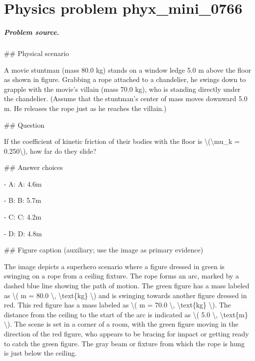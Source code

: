 
\chapter{Physics problem phyx\_mini\_0766}
\label{ch:PhyXMiniProblems_problem_phyx_mini_0766}

\paragraph{Problem source.}
\#\# Physical scenario

A movie stuntman (mass 80.0 kg) stands on a window ledge 5.0 m above the floor as shown in figure. Grabbing a rope attached to a chandelier, he swings down to grapple with the movie's villain (mass 70.0 kg), who is standing directly under the chandelier. (Assume that the stuntman's center of mass moves downward 5.0 m. He releases the rope just as he reaches the villain.)

\#\# Question

If the coefficient of kinetic friction of their bodies with the floor is \textbackslash{}(\textbackslash{}mu\_k = 0.250\textbackslash{}), how far do they slide?

\#\# Answer choices

- A: A: 4.6m

- B: B: 5.7m

- C: C: 4.2m

- D: D: 4.8m

\#\# Figure caption (auxiliary; use the image as primary evidence)

The image depicts a superhero scenario where a figure dressed in green is swinging on a rope from a ceiling fixture. The rope forms an arc, marked by a dashed blue line showing the path of motion. The green figure has a mass labeled as \textbackslash{}( m = 80.0 \textbackslash{}, \textbackslash{}text\{kg\} \textbackslash{}) and is swinging towards another figure dressed in red. This red figure has a mass labeled as \textbackslash{}( m = 70.0 \textbackslash{}, \textbackslash{}text\{kg\} \textbackslash{}). The distance from the ceiling to the start of the arc is indicated as \textbackslash{}( 5.0 \textbackslash{}, \textbackslash{}text\{m\} \textbackslash{}). The scene is set in a corner of a room, with the green figure moving in the direction of the red figure, who appears to be bracing for impact or getting ready to catch the green figure. The gray beam or fixture from which the rope is hung is just below the ceiling.

